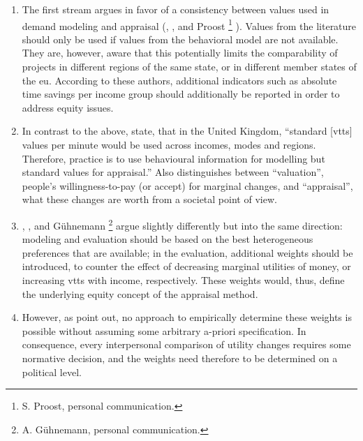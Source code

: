 \begin{enumerate}\styleEnumerate
%
\item The first stream argues in favor of a consistency between values used in demand modeling and appraisal 
(\citet[p.255]{Grant-MullerEtAl2001EconomicTransportAppraisalRevisited}, \citet[p.S4 and p.S8]{HEATCO2006Delivrable5}, and Proost%
%
\footnote{
%
S. Proost, personal communication.
%
}%
%
). Values from the literature should only be used if values from the behavioral model are not available. They are, however, aware that this potentially limits the comparability of projects in different regions of the same state, or in different member states of the \gls{eu}.
%
According to these authors, additional indicators such as absolute time savings per income group should additionally be reported in order to address equity issues.
%
\item In contrast to the above, \citet[p.12]{MackieWorsley2013ComparisonTransportAppraisal} state, that in the United Kingdom, \enquote{standard [\gls{vtts}] values per minute would be used across incomes, modes and regions. Therefore, practice is to use behavioural information for modelling but standard values for appraisal.} Also \citet{Daly2013hEARTKeynote} distinguishes between ``valuation'', \ie people's willingness-to-pay (or accept) for marginal changes, and ``appraisal'', \ie what these changes are worth from a societal point of view.
%
\item \label{lbl:weights} \citet{Fowkes2010ValueOfTTS}, \citet{OECD2006CBA}, and G\"uhnemann%
%
\footnote{
%
A. G\"uhnemann, personal communication.
%
}
%
argue slightly differently but into the same direction: modeling and evaluation should be based on the best heterogeneous preferences that are available; in the evaluation, additional weights should be introduced, \eg to counter the effect of decreasing marginal utilities of money, or increasing \gls{vtts} with income, respectively. These weights would, thus, define the underlying equity concept of the appraisal method.
%
\item However, as \citet{AhlheimRose1989MessungIndividuellerWohlfahrt} point out, no approach to empirically determine these weights is possible without assuming some arbitrary a-priori specification.
%
%
%
In consequence, every interpersonal comparison of utility changes requires some normative decision, and the weights need therefore to be determined on a political level.
%
\end{enumerate}


